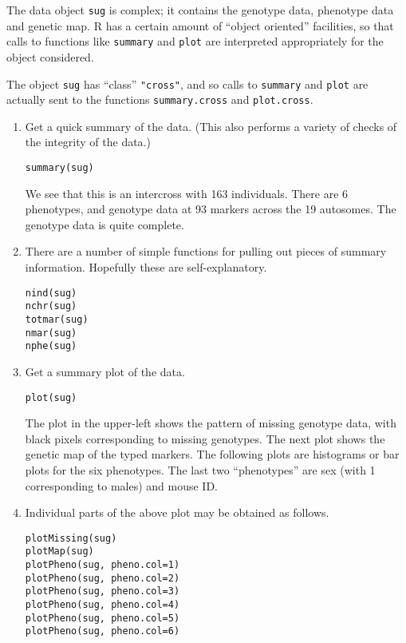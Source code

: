 \documentclass[10pt,letterpaper]{article}
\newcommand{\usercolor}{\color [named]{BlueViolet}}
\begin{document}
The data object \verb-sug- is complex; it contains the genotype
data, phenotype data and genetic map.  R has a certain amount of
``object oriented'' facilities, so that calls to functions like
\verb-summary- and \verb-plot- are interpreted appropriately for the object
considered.  

The object \verb-sug- has ``class'' \verb-"cross"-, and so calls to
\verb-summary- and \verb-plot- are actually sent to the functions
\verb-summary.cross- and \verb-plot.cross-.

\begin{enumerate}
\addtocounter{enumi}{6}
\item Get a quick summary of the data.  (This also performs a variety
  of checks of the integrity of the data.)

\usercolor
\verb|summary(sug)|
\normalcolor

We see that this is an intercross with 163 individuals.  There are 6
phenotypes, and genotype data at 93 markers across the 19 autosomes.
The genotype data is quite complete.

\item There are a number of simple functions for pulling out pieces of summary
  information.  Hopefully these are self-explanatory.

\usercolor
\verb|nind(sug)| \\
\verb|nchr(sug)| \\
\verb|totmar(sug)| \\
\verb|nmar(sug)| \\
\verb|nphe(sug)|
\normalcolor



\item Get a summary plot of the data.

\usercolor
\verb|plot(sug)|
\normalcolor

The plot in the upper-left shows the pattern of missing genotype data, with
black pixels corresponding to missing genotypes.  The next plot shows
the genetic map of the typed markers.  The following plots are
histograms or bar plots for the six phenotypes.  The last two
``phenotypes'' are sex (with 1 corresponding to males) and mouse ID.


\item Individual parts of the above plot may be obtained as follows.

\usercolor
\verb|plotMissing(sug)| \\
\verb|plotMap(sug)| \\
\verb|plotPheno(sug, pheno.col=1)| \\
\verb|plotPheno(sug, pheno.col=2)| \\
\verb|plotPheno(sug, pheno.col=3)| \\
\verb|plotPheno(sug, pheno.col=4)| \\
\verb|plotPheno(sug, pheno.col=5)| \\
\verb|plotPheno(sug, pheno.col=6)|
\normalcolor


\end{enumerate}
\end{document}

